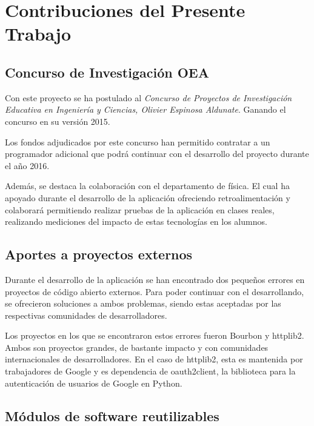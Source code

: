 \chapter{Contribuciones del Presente
Trabajo}\label{contribuciones-del-presente-trabajo}

\section{Concurso de Investigación
OEA}\label{concurso-de-investigaciuxf3n-oea}

Con este proyecto se ha postulado al \emph{Concurso de Proyectos de
Investigación Educativa en Ingeniería y Ciencias, Olivier Espinosa
Aldunate}. Ganando el concurso en su versión 2015.

Los fondos adjudicados por este concurso han permitido contratar a un
programador adicional que podrá continuar con el desarrollo del proyecto
durante el año 2016.

Además, se destaca la colaboración con el departamento de física. El
cual ha apoyado durante el desarrollo de la aplicación ofreciendo
retroalimentación y colaborará permitiendo realizar pruebas de la
aplicación en clases reales, realizando mediciones del impacto de estas
tecnologías en los alumnos.

\section{Aportes a proyectos
externos}\label{aportes-a-proyectos-externos}

Durante el desarrollo de la aplicación se han encontrado dos pequeños
errores en proyectos de código abierto externos. Para poder continuar
con el desarrollando, se ofrecieron soluciones a ambos problemas, siendo
estas aceptadas por las respectivas comunidades de desarrolladores.

Los proyectos en los que se encontraron estos errores fueron Bourbon y
httplib2. Ambos son proyectos grandes, de bastante impacto y con
comunidades internacionales de desarrolladores. En el caso de httplib2,
esta es mantenida por trabajadores de Google y es dependencia de
oauth2client, la biblioteca para la autenticación de usuarios de Google
en Python.

\section{Módulos de software
reutilizables}\label{muxf3dulos-de-software-reutilizables}

